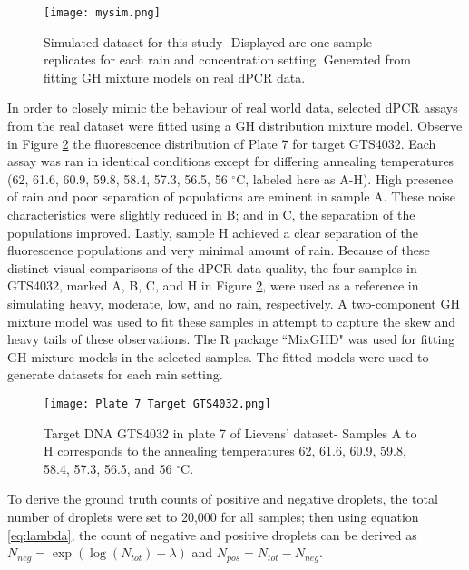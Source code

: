 \begin{figure}[h]
    \centering
    \texttt{[image: mysim.png]}
    \caption[Simulated dataset for this study]{Simulated dataset for this study- Displayed are one sample replicates for each rain and concentration setting. Generated from fitting GH mixture models on real dPCR data.}
        \label{fig:mysim}
\end{figure}

In order to closely mimic the behaviour of real world data, selected dPCR assays from the real dataset were fitted using a GH distribution mixture model. Observe in Figure \ref{fig:realdata_gts} the fluorescence distribution of Plate 7 for target GTS4032. Each assay was ran in identical conditions except for differing annealing temperatures (62, 61.6, 60.9, 59.8, 58.4, 57.3, 56.5, 56 \(^{\circ}\)C, labeled here as A-H). High presence of rain and poor separation of populations are eminent in sample A. These noise characteristics were slightly reduced in B; and in C, the separation of the populations improved. Lastly, sample H achieved a clear separation of the fluorescence populations and very minimal amount of rain. Because of these distinct visual comparisons of the dPCR data quality, the four samples in GTS4032, marked A, B, C, and H in Figure \ref{fig:realdata_gts}, were used as a reference in simulating heavy, moderate, low, and no rain, respectively. A two-component GH mixture model was used to fit these samples in attempt to capture the skew and heavy tails of these observations. The R package ``MixGHD" \cite{MixGHD} was used for fitting GH mixture models in the selected samples. The fitted models were used to generate datasets for each rain setting.

\begin{figure}
    \centering
    \texttt{[image: Plate 7 Target GTS4032.png]}
    \caption[Target DNA GTS4032 in plate 7 of Lievens' dataset]%
    {Target DNA GTS4032 in plate 7 of Lievens' dataset- Samples A to H corresponds to the annealing temperatures 62, 61.6, 60.9, 59.8, 58.4, 57.3, 56.5, and 56 \(^{\circ}\)C.}
        \label{fig:realdata_gts}
\end{figure}

To derive the ground truth counts of positive and negative droplets, the total number of droplets were set to 20,000 for all samples; then using equation \ref{eq:lambda}, the count of negative and positive droplets can be derived as \(N_{neg} = \exp(\log{(N_{tot})} - \lambda)\) and \(N_{pos} = N_{tot} - N_{neg}\). 

